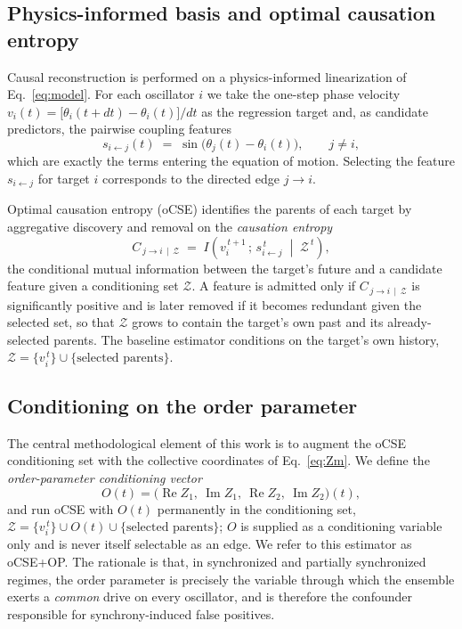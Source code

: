 \subsection{Physics-informed basis and optimal causation entropy}
\label{sec:ocse}

Causal reconstruction is performed on a physics-informed linearization of
Eq.~\eqref{eq:model}. For each oscillator $i$ we take the one-step phase
velocity $v_i(t)=\big[\theta_i(t{+}dt)-\theta_i(t)\big]/dt$ as the regression
target and, as candidate predictors, the pairwise coupling features
\begin{equation}
s_{i\leftarrow j}(t)\;=\;\sin\!\big(\theta_j(t)-\theta_i(t)\big),
\qquad j\neq i,
\label{eq:basis}
\end{equation}
which are exactly the terms entering the equation of motion. Selecting the
feature $s_{i\leftarrow j}$ for target $i$ corresponds to the directed edge
$j\!\to\! i$.

Optimal causation entropy (oCSE) \cite{Sun2015} identifies the parents of each
target by aggregative discovery and removal on the \emph{causation entropy}
\begin{equation}
C_{\,j\to i\,\mid\,\mathcal{Z}}
\;=\; I\!\left(v_i^{\,t+1}\,;\,s_{i\leftarrow j}^{\,t}\;\middle|\;\mathcal{Z}^{\,t}\right),
\label{eq:ce}
\end{equation}
the conditional mutual information between the target's future and a candidate
feature given a conditioning set $\mathcal{Z}$. A feature is admitted only if
$C_{\,j\to i\,\mid\,\mathcal{Z}}$ is significantly positive and is later removed
if it becomes redundant given the selected set, so that $\mathcal{Z}$ grows to
contain the target's own past and its already-selected parents. The baseline
estimator conditions on the target's own history,
$\mathcal{Z}=\{v_i^{\,t}\}\cup\{\text{selected parents}\}$.

\subsection{Conditioning on the order parameter}
\label{sec:opcond}

The central methodological element of this work is to augment the oCSE
conditioning set with the collective coordinates of
Eq.~\eqref{eq:Zm}. We define the \emph{order-parameter conditioning vector}
\begin{equation}
O(t)=\big(\operatorname{Re}Z_1,\ \operatorname{Im}Z_1,\
\operatorname{Re}Z_2,\ \operatorname{Im}Z_2\big)(t),
\label{eq:Ovec}
\end{equation}
and run oCSE with $O(t)$ permanently in the conditioning set,
$\mathcal{Z}=\{v_i^{\,t}\}\cup O(t)\cup\{\text{selected parents}\}$; $O$ is
supplied as a conditioning variable only and is never itself selectable as an
edge. We refer to this estimator as oCSE+OP. The rationale is that, in
synchronized and partially synchronized regimes, the order parameter is
precisely the variable through which the ensemble exerts a \emph{common} drive
on every oscillator, and is therefore the confounder responsible for
synchrony-induced false positives.

